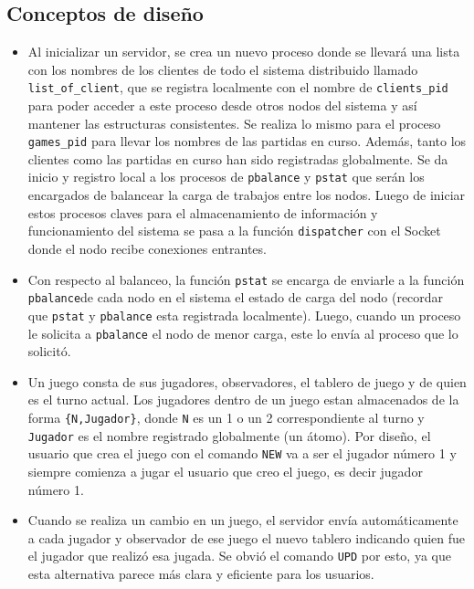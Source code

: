 \documentclass[a4paper]{article}
\newcommand{\blacktr}[0]{\item[$\blacktriangleright$]}
\begin{document}
\subsection*{Conceptos de diseño}
\begin{itemize}
  \blacktr Al inicializar un servidor, se crea un nuevo proceso donde se llevará una lista con los nombres de los clientes de todo el sistema distribuido llamado \texttt{list_of_client}, que se registra localmente con el nombre de \texttt{clients_pid} para poder acceder a este proceso desde otros nodos del sistema y así mantener las estructuras consistentes. Se realiza lo mismo para el proceso \texttt{games_pid} para llevar los nombres de las partidas en curso. Además, tanto los clientes como las partidas en curso han sido registradas globalmente. Se da inicio y registro local a los procesos de \texttt{pbalance} y \texttt{pstat} que serán los encargados de balancear la carga de trabajos entre los nodos. Luego de iniciar estos procesos claves para el almacenamiento de información y funcionamiento del sistema se pasa a la función \texttt{dispatcher} con el Socket donde el nodo recibe conexiones entrantes.%

  \blacktr Con respecto al balanceo, la función \texttt{pstat} se encarga de enviarle a la función \texttt{pbalance}de cada nodo en el sistema el estado de carga del nodo (recordar que \texttt{pstat} y \texttt{pbalance} esta registrada localmente). Luego, cuando un proceso le solicita a \texttt{pbalance} el nodo de menor carga, este lo envía al proceso que lo solicitó.%

  \blacktr Un juego consta de sus jugadores, observadores, el tablero de juego y de quien es el turno actual. Los jugadores dentro de un juego estan almacenados de la forma \texttt{\{N,Jugador\}}, donde \texttt{N} es un 1 o un 2 correspondiente al turno y \texttt{Jugador} es el nombre registrado globalmente (un átomo). Por diseño, el usuario que crea el juego con el comando \texttt{NEW} va a ser el jugador número 1 y siempre comienza a jugar el usuario que creo el juego, es decir jugador número 1.

  \blacktr Cuando se realiza un cambio en un juego, el servidor envía automáticamente a cada jugador y observador de ese juego el nuevo tablero indicando quien fue el jugador que realizó esa jugada. Se obvió el comando \texttt{UPD} por esto, ya que esta alternativa parece más clara y eficiente para los usuarios. 
\end{itemize}
\end{document}

